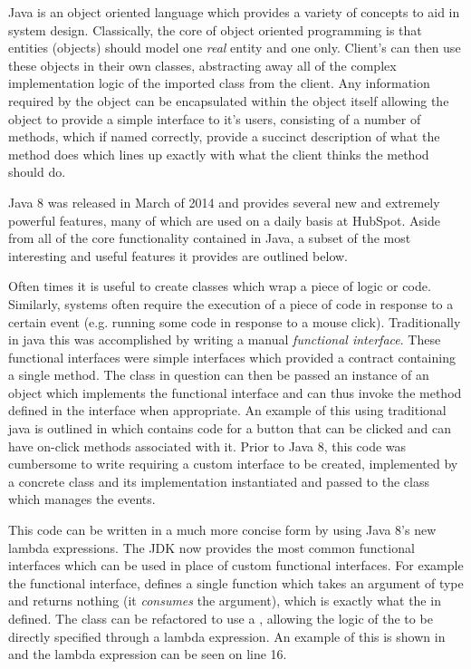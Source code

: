 Java is an object oriented language which provides a variety of concepts to aid in system design. Classically, the core of object oriented programming is that entities (objects) should model one \textit{real} entity and one only. Client's can then use these objects in their own classes, abstracting away all of the complex implementation logic of the imported class from the client. Any information required by the object can be encapsulated within the object itself allowing the object to provide a simple interface to it's users, consisting of a number of methods, which if named correctly, provide a succinct description of what the method does which lines up exactly with what the client thinks the method should do.

Java 8 was released in March of 2014 and provides several new and extremely powerful features, many of which are used on a daily basis at HubSpot. Aside from all of the core functionality contained in Java, a subset of the most interesting and useful features it provides are outlined below.

Often times it is useful to create classes which wrap a piece of logic or code. Similarly, systems often require the execution of a piece of code in response to a certain event (e.g. running some code in response to a mouse click). Traditionally in java this was accomplished by writing a manual \textit{functional interface}. These functional interfaces were simple interfaces which provided a contract containing a single method. The class in question can then be passed an instance of an object which implements the functional interface and can thus invoke the method defined in the interface when appropriate. An example of this using traditional java is outlined in  which contains code for a button that can be clicked and can have on-click methods associated with it. Prior to Java 8, this code was cumbersome to write requiring a custom interface to be created, implemented by a concrete class and its implementation instantiated and passed to the class which manages the events. 



This code can be written in a much more concise form by using Java 8's new lambda expressions. The JDK now provides the most common functional interfaces which can be used in place of custom functional interfaces. For example the  functional interface, defines a single  function which takes an argument of type  and returns nothing (it \textit{consumes} the argument), which is exactly what the  in  defined. The  class can be refactored to use a , allowing the logic of the  to be directly specified through a lambda expression. An example of this is shown in  and the lambda expression can be seen on line 16.

